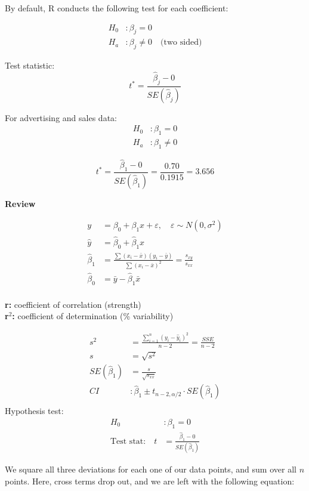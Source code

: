 \begin{example}[continued]
By default, R conducts the following test for each coefficient:

\[
\begin{aligned}
    H_0&: \beta_j = 0 \\
    H_a&: \beta_j \ne 0 \quad \text{(two sided)}
\end{aligned}
\]

Test statistic:
\[
t^* = \frac{\hat{\beta}_j - 0}{SE(\hat{\beta}_j)}
\]

For advertising and sales data:
\[
\begin{aligned}
    H_0&: \beta_1 = 0 \\
    H_a&: \beta_1 \ne 0
\end{aligned}
\]

\[
t^* = \frac{\hat{\beta}_1 - 0}{SE(\hat{\beta}_1)} = \frac{0.70}{0.1915} = 3.656
\]

\end{example}
\begin{nt}
\textbf{Review}

\begin{align*}
y &= \beta_0 + \beta_1 x + \varepsilon, \quad \varepsilon \sim N(0, \sigma^2) \\
\hat{y} &= \hat{\beta}_0 + \hat{\beta}_1 x \\
\hat{\beta}_1 &= \frac{\sum (x_i - \bar{x})(y_i - \bar{y})}{\sum (x_i - \bar{x})^2} = \frac{s_{xy}}{s_{xx}} \\
\hat{\beta}_0 &= \bar{y} - \hat{\beta}_1 \bar{x} \\
\end{align*}

\textbf{r:} coefficient of correlation (strength) \\
\textbf{r$^2$:} coefficient of determination (\% variability)


\begin{align*}
s^2 &= \frac{\sum_{i=1}^n (y_i - \hat{y}_i)^2}{n - 2} = \frac{SSE}{n - 2} \\
s &= \sqrt{s^2} \\
SE(\hat{\beta}_1) &= \frac{s}{\sqrt{s_{xx}}} \\
CI &: \hat{\beta}_1 \pm t_{n - 2, \alpha/2} \cdot SE(\hat{\beta}_1) \\
\end{align*}
Hypothesis test:
\begin{align*}
H_0 &: \beta_1 = 0 \\
\text{Test stat:}\quad t &= \frac{\hat{\beta}_1 - 0}{SE(\hat{\beta}_1)}
\end{align*}

\end{nt}
We square all three deviations for each one of our data points, and sum over all $n$ points. Here, cross terms drop out, and we are left with the following equation:

